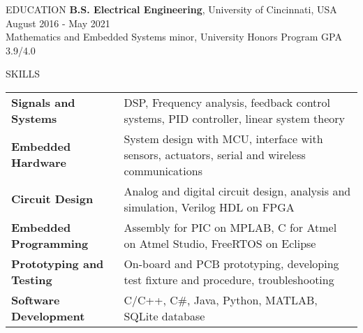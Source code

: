 \documentclass{../lib/resume} %
\begin{document}

\begin{rSection}{EDUCATION}
    {\bf B.S. Electrical Engineering}, University of Cincinnati, USA \hfill {August 2016 - May 2021}\\
    Mathematics and Embedded Systems minor, University Honors Program \hfill {GPA 3.9/4.0}




\end{rSection}

\begin{rSection}{SKILLS}

    \begin{tabular}{ @{} >{\bfseries}l @{\hspace{2ex}} l }
        Signals and Systems     & DSP, Frequency analysis, feedback control systems, PID controller, linear system theory       \\
        Embedded Hardware       & System design with MCU, interface with sensors, actuators, serial and wireless communications \\
        Circuit Design          & Analog and digital circuit design, analysis and simulation, Verilog HDL on FPGA               \\
        Embedded Programming    & Assembly for PIC on MPLAB, C for Atmel on Atmel Studio, FreeRTOS on Eclipse                   \\
        Prototyping and Testing & On-board and PCB prototyping, developing test fixture and procedure, troubleshooting          \\
        Software Development    & C/C++, C\#, Java, Python, MATLAB, SQLite database                                             \\
    \end{tabular}
\end{rSection}
\end{document}
